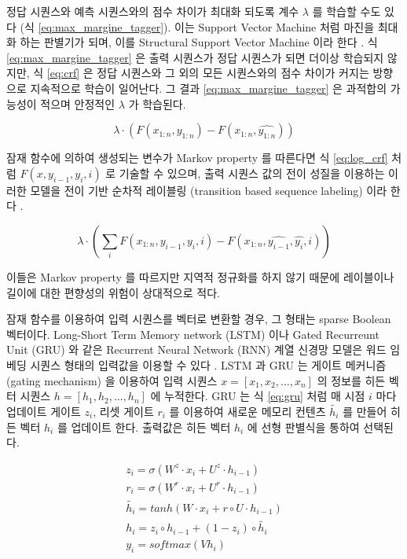 \documentclass[oneside, ko,phd]{snuthesis_utf8_kor}
\begin{document}
정답 시퀀스와 예측 시퀀스와의 점수 차이가 최대화 되도록 계수 $\lambda$ 를 학습할 수도 있다 (식 \ref{eq:max_margine_tagger}).
이는 Support Vector Machine 처럼 마진을 최대화 하는 판별기가 되며, 이를 Structural Support Vector Machine 이라 한다 \cite{taskar2004max, tsochantaridis2005large}.
식 \ref{eq:max_margine_tagger} 은 출력 시퀀스가 정답 시퀀스가 되면 더이상 학습되지 않지만, 식 \ref{eq:crf} 은 정답 시퀀스와 그 외의 모든 시퀀스와의 점수 차이가 커지는 방향으로 지속적으로 학습이 일어난다.
그 결과 \ref{eq:max_margine_tagger} 은 과적합의 가능성이 적으며 안정적인 $\lambda$ 가 학습된다.

\begin{equation}
  \label{eq:max_margine_tagger}
  \lambda \cdot \left( F(x_{1:n}, y_{1:n}) - F(x_{1:n}, \hat{y_{1:n}}) \right)
\end{equation}

잠재 함수에 의하여 생성되는 변수가 Markov property 를 따른다면 식 \ref{eq:log_crf} 처럼 $F(x, y_{i-1}, y_{i}, i)$ 로 기술할 수 있으며, 출력 시퀀스 값의 전이 성질을 이용하는 이러한 모델을 전이 기반 순차적 레이블링 (transition based sequence labeling) 이라 한다 \cite{bohnet2012transition}.

\begin{equation}
  \label{eq:transition_based_tagger_i}
  \lambda \cdot \left( \sum_i F(x_{1:n}, y_{i-1}, y_i, i) - F(x_{1:n}, \hat{y_{i-1}}, \hat{y_i}, i) \right)
\end{equation}

이들은 Markov property 를 따르지만 지역적 정규화를 하지 않기 때문에 레이블이나 길이에 대한 편향성의 위험이 상대적으로 적다.

잠재 함수를 이용하여 입력 시퀀스를 벡터로 변환할 경우, 그 형태는 sparse Boolean 벡터이다.
Long-Short Term Memory network (LSTM) 이나 Gated Recurreunt Unit (GRU) 와 같은 Recurrent Neural Network (RNN) 계열 신경망 모델은 워드 임베딩 시퀀스 형태의 입력값을 이용할 수 있다 \cite{cho2014learning, hochreiter1997long}.
LSTM 과 GRU 는 게이트 메커니즘 (gating mechanism) 을 이용하여 입력 시퀀스 $x = [x_1, x_2, \dots, x_n]$ 의 정보를 히든 벡터 시퀀스 $h = [h_1, h_2, \dots, h_n]$ 에 누적한다.
GRU 는 식 \ref{eq:gru} 처럼 매 시점 $i$ 마다 업데이트 게이트 $z_i$, 리셋 게이트 $r_i$ 를 이용하여 새로운 메모리 컨텐츠 $\tilde{h_i}$ 를 만들어 히든 벡터 $h_i$ 를 업데이트 한다.
출력값은 히든 벡터 $h_i$ 에 선형 판별식을 통하여 선택된다.

\begin{equation}
  \label{eq:gru}
  \begin{aligned}
  z_i = \sigma(W^z \cdot x_i + U^z \cdot h_{i-1}) \\
  r_i = \sigma(W^r \cdot x_i + U^r \cdot h_{i-1}) \\
  \tilde{h_i} = tanh \left( W \cdot x_i + r \circ U \cdot h_{i-1}\right) \\
  h_i = z_i \circ h_{i-1} + (1 - z_i) \circ \tilde{h_i} \\
  y_i = softmax(Vh_i)
  \end{aligned}
\end{equation}
\end{document}
